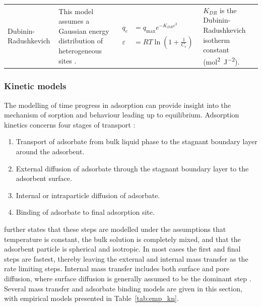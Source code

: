 \begin{landscape}
\begin{footnotesize}
\begin{longtable}{>{\raggedright\arraybackslash}p{2cm}p{7.25cm}p{4.5cm}p{7.25cm}}
			Dubinin-Radushkevich
			
			& This model assumes a Gaussian energy distribution of heterogeneous sites \parencite{Inyinbor2016}.
			
			& {\begin{align}
				q_e &= q_\textrm{max} e^{-K_{DR} \varepsilon^2} \\
				\varepsilon &= RT \ln \left(1 + \frac{1}{C_e}\right)
				\end{align}}
			
			& $ K_{DR} $ is the Dubinin-Radushkevich isotherm constant   (\si{\mole\squared\per\joule\squared}). \\
		\end{longtable}
	\end{footnotesize}
\end{landscape}
\restoregeometry

\subsubsection{Kinetic models} 

The modelling of time progress in adsorption can provide insight into the mechanism of sorption and behaviour leading up to equilibrium. Adsorption kinetics concerns four stages of transport \parencite{Worch2012}:
\begin{enumerate}
	\item Transport of adsorbate from bulk liquid phase to the stagnant boundary layer around the adsorbent.
	\item External diffusion of adsorbate through the stagnant boundary layer to the adsorbent surface.
	\item Internal or intraparticle diffusion of adsorbate. 
	\item Binding of adsorbate to final adsorption site.
\end{enumerate}
\textcite{Worch2012} further states that these steps are modelled under the assumptions that temperature is constant, the bulk solution is completely mixed, and that the adsorbent particle is spherical and isotropic. In most cases the first and final steps are fastest, thereby leaving the external and internal mass transfer as the rate limiting steps. Internal mass transfer includes both surface and pore diffusion, where surface diffusion is generally assumed to be the dominant step \parencite{Worch2012}. Several mass transfer and adsorbate binding models are given in this section, with empirical models presented in Table~\ref{tab:emp_kn}.


